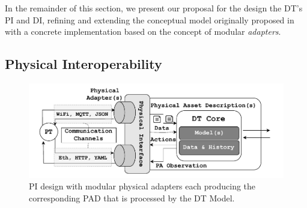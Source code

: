 In the remainder of this section, we present our proposal for the design the \ac{DT}'s \ac{PI} and \ac{DI}, refining and extending the conceptual model originally proposed in \cite{web-of-dt-ricci-2022} with a concrete implementation based on the concept of modular \emph{adapters}.

\subsection{Physical Interoperability}
\label{sec:physical_interoperability}

\begin{figure}[t]
    \centering
    \includegraphics[width=\columnwidth]{figures/dt-interoperability/dt_interoperability_physical.pdf}
    \caption{PI design with modular physical adapters each producing the corresponding \acl{PAD} that is processed by the \ac{DT} Model.}
    \label{fig:physical_interoperability}
\end{figure}


  

